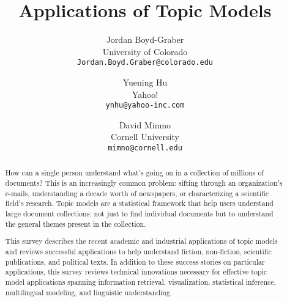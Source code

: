 \documentclass[openany]{now} %
\title{Applications of Topic Models}
\author{
Jordan Boyd-Graber \\
University of Colorado \\
\texttt{Jordan.Boyd.Graber@colorado.edu}
\and
Yuening Hu \\
Yahoo! \\
\texttt{ynhu@yahoo-inc.com}
\and
David Mimno \\
Cornell University \\
\texttt{mimno@cornell.edu}
}
\begin{document}
\copyrightowner{}

\frontmatter  %

\maketitle

\tableofcontents

\mainmatter

\begin{abstract}
  How can a single person understand what's going on in a collection
  of millions of documents?  This is an increasingly common problem:
  sifting through an organization's e-mails, understanding a decade
  worth of newspapers, or characterizing a scientific field's
  research.  Topic models are a statistical framework that help users
  understand large document collections: not just to find individual
  documents but to understand the general themes
  present in the collection.

  This survey describes the recent academic and industrial
  applications of topic models and reviews successful applications to
  help understand fiction, non-fiction, scientific publications, and
  political texts.  In addition to these success stories on particular
  applications, this survey reviews technical innovations necessary
  for effective topic model applications spanning information
  retrieval, visualization, statistical inference, multilingual
  modeling, and linguistic understanding.
\end{abstract}













\backmatter  %



\end{document}
